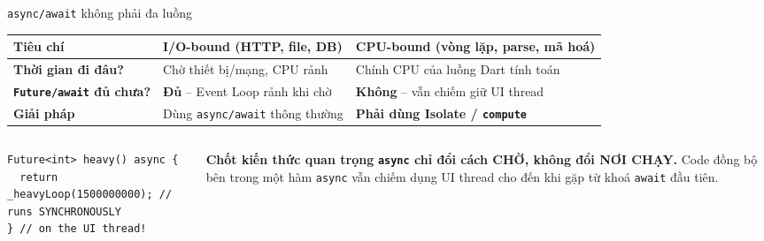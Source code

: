 \documentclass[aspectratio=169,11pt]{beamer}
\begin{document}
\begin{frame}[fragile]{\texttt{async/await} không phải đa luồng}
  \begin{table}
    \scriptsize
    \centering
    \begin{tabular}{p{2.6cm} >{\raggedright\arraybackslash}p{4.6cm} >{\raggedright\arraybackslash}p{5.0cm}}
      \toprule
      \rowcolor{purpL}
      \textbf{Tiêu chí} & \textbf{I/O-bound} (HTTP, file, DB) & \textbf{CPU-bound} (vòng lặp, parse, mã hoá) \\
      \midrule
      \textbf{Thời gian đi đâu?} & Chờ thiết bị/mạng, CPU rảnh & Chính CPU của luồng Dart tính toán \\
      \textbf{\texttt{Future/await} đủ chưa?} & \textbf{Đủ} -- Event Loop rảnh khi chờ & \textbf{Không} -- vẫn chiếm giữ UI thread \\
      \textbf{Giải pháp} & Dùng \texttt{async/await} thông thường & \textbf{Phải dùng Isolate / \texttt{compute}} \\
      \bottomrule
    \end{tabular}
  \end{table}

  \vspace{0.1cm}
  \begin{columns}[T]
    \begin{column}{0.48\textwidth}
\begin{lstlisting}
Future<int> heavy() async {
  return _heavyLoop(1500000000); // runs SYNCHRONOUSLY
} // on the UI thread!
\end{lstlisting}
    \end{column}
    \begin{column}{0.52\textwidth}
      \begin{block}{\scriptsize\bfseries Chốt kiến thức quan trọng}
        \scriptsize \textbf{\texttt{async} chỉ đổi cách CHỜ, không đổi NƠI CHẠY.} Code đồng bộ bên trong một hàm \texttt{async} vẫn chiếm dụng UI thread cho đến khi gặp từ khoá \texttt{await} đầu tiên.
      \end{block}
    \end{column}
  \end{columns}
\end{frame}
\end{document}
